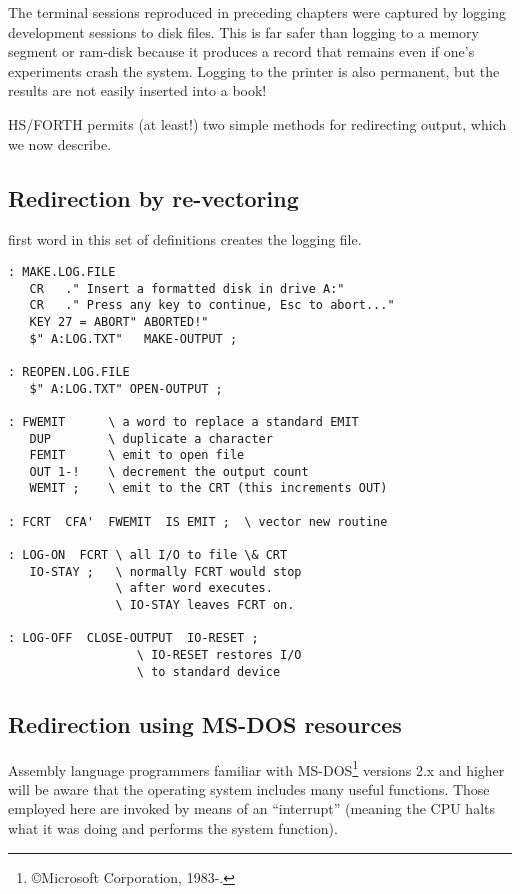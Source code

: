 The terminal sessions reproduced in preceding chapters were captured by logging development sessions to disk files.
This is far safer than logging to a memory segment or ram-disk because it produces a record that remains even if one’s experiments crash the system.
Logging to the printer is also permanent, but the results are not easily inserted into a book!

HS/FORTH permits (at least!) two simple methods for redirecting output, which we now describe.

\subsection{Redirection by re-vectoring}
 first word in this set of definitions creates the logging file.

\begin{lstlisting}
: MAKE.LOG.FILE
   CR   ." Insert a formatted disk in drive A:"
   CR   ." Press any key to continue, Esc to abort..."
   KEY 27 = ABORT" ABORTED!"
   $" A:LOG.TXT"   MAKE-OUTPUT ;

: REOPEN.LOG.FILE
   $" A:LOG.TXT" OPEN-OUTPUT ;

: FWEMIT      \ a word to replace a standard EMIT
   DUP        \ duplicate a character
   FEMIT      \ emit to open file
   OUT 1-!    \ decrement the output count
   WEMIT ;    \ emit to the CRT (this increments OUT)

: FCRT  CFA'  FWEMIT  IS EMIT ;  \ vector new routine

: LOG-ON  FCRT \ all I/O to file \& CRT
   IO-STAY ;   \ normally FCRT would stop
               \ after word executes.
               \ IO-STAY leaves FCRT on.

: LOG-OFF  CLOSE-OUTPUT  IO-RESET ;
                  \ IO-RESET restores I/O
                  \ to standard device
\end{lstlisting}

\subsection{Redirection using MS-DOS resources}

Assembly language programmers familiar with MS-DOS\footnote{\copyright Microsoft Corporation, 1983-.} versions 2.x and higher will be aware that the operating system includes many useful functions.
Those employed here are invoked by means of an ``interrupt'' (meaning the CPU halts what it was doing and performs the system function).

